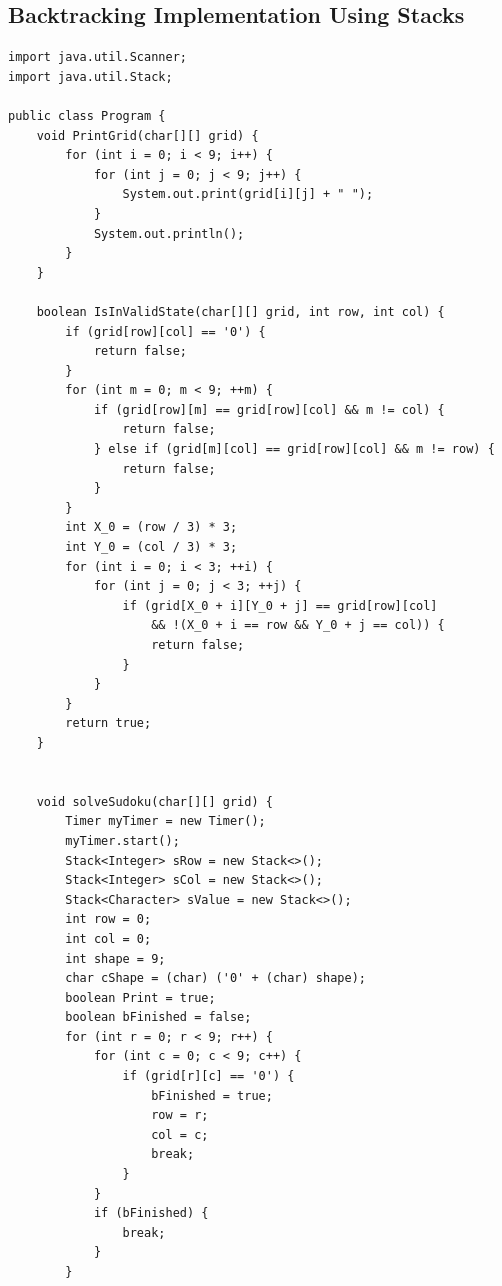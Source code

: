 \documentclass[11pt]{article}
\begin{document}
\newpage
\begin{appendices}
\section{Backtracking Implementation Using Stacks}
\begin{lstlisting}
import java.util.Scanner;
import java.util.Stack;

public class Program {
    void PrintGrid(char[][] grid) {
        for (int i = 0; i < 9; i++) {
            for (int j = 0; j < 9; j++) {
                System.out.print(grid[i][j] + " ");
            }
            System.out.println();
        }
    }

    boolean IsInValidState(char[][] grid, int row, int col) {
        if (grid[row][col] == '0') {
            return false;
        }
        for (int m = 0; m < 9; ++m) {
            if (grid[row][m] == grid[row][col] && m != col) {
                return false;
            } else if (grid[m][col] == grid[row][col] && m != row) {
                return false;
            }
        }
        int X_0 = (row / 3) * 3;
        int Y_0 = (col / 3) * 3;
        for (int i = 0; i < 3; ++i) {
            for (int j = 0; j < 3; ++j) {
                if (grid[X_0 + i][Y_0 + j] == grid[row][col] 
                    && !(X_0 + i == row && Y_0 + j == col)) {
                    return false;
                }
            }
        }
        return true;
    }


    void solveSudoku(char[][] grid) {
        Timer myTimer = new Timer();
        myTimer.start();
        Stack<Integer> sRow = new Stack<>();
        Stack<Integer> sCol = new Stack<>();
        Stack<Character> sValue = new Stack<>();
        int row = 0;
        int col = 0;
        int shape = 9;
        char cShape = (char) ('0' + (char) shape);
        boolean Print = true;
        boolean bFinished = false;
        for (int r = 0; r < 9; r++) {
            for (int c = 0; c < 9; c++) {
                if (grid[r][c] == '0') {
                    bFinished = true;
                    row = r;
                    col = c;
                    break;
                }
            }
            if (bFinished) {
                break;
            }
        }


\end{lstlisting}
\end{appendices}
\end{document}
